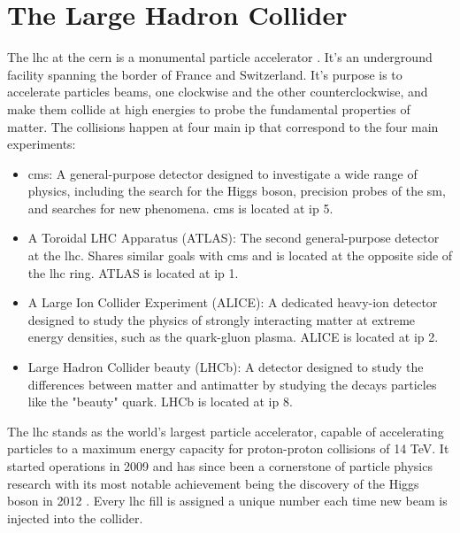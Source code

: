 \section{The Large Hadron Collider}
\label{subsec:lhc}


The \acrfull{lhc} at the \acrfull{cern} is a monumental particle accelerator \cite{lhc}. It's an underground facility spanning the border of France and Switzerland. It's purpose is to accelerate particles beams, one clockwise and the other counterclockwise, and make them collide at high energies to probe the fundamental properties of matter. The collisions happen at four main \acrfull{ip} that correspond to the four main experiments:
\begin{itemize}
	\item \acrfull{cms}: A general-purpose detector designed to investigate a wide range of physics, including the search for the Higgs boson, precision probes of the \acrshort{sm}, and searches for new phenomena. \acrshort{cms} is located at \acrshort{ip} 5.
	\item A Toroidal LHC Apparatus (ATLAS): The second general-purpose detector at the \acrshort{lhc}. Shares similar goals with \acrshort{cms} and is located at the opposite side of the \acrshort{lhc} ring. ATLAS is located at \acrshort{ip} 1.
	\item A Large Ion Collider Experiment (ALICE): A dedicated heavy-ion detector designed to study the physics of strongly interacting matter at extreme energy densities, such as the quark-gluon plasma. ALICE is located at \acrshort{ip} 2.
	\item Large Hadron Collider beauty (LHCb): A detector designed to study the differences between matter and antimatter by studying the decays particles like the "beauty" quark. LHCb is located at \acrshort{ip} 8.
\end{itemize}

The \acrshort{lhc} stands as the world's largest particle accelerator, capable of accelerating particles to a maximum energy capacity for proton-proton collisions of 14 TeV. It started operations in 2009 and has since been a cornerstone of particle physics research with its most notable achievement being the discovery of the Higgs boson in 2012 \cite{HiggsDiscovery}. Every \acrshort{lhc} fill is assigned a unique number each time new beam is injected into the collider.

